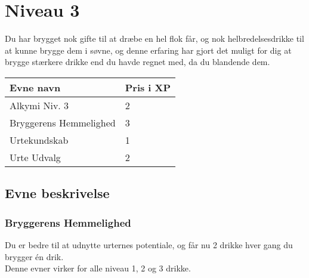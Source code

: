\chapter*{Niveau 3}
Du har brygget nok gifte til at dræbe en hel flok får, og nok helbredelsesdrikke til at kunne brygge dem i søvne, og denne erfaring har gjort det muligt for dig at brygge stærkere drikke end du havde regnet med, da du blandende dem.

\begin{table}[H]
    \centering
    \begin{tabular}{|p{}|p{}|}
    \rowcolor{cerulean!80}\hline
        Evne navn & Pris i XP \\\hline
        Alkymi Niv. 3 & 2\\\hline
        Bryggerens Hemmelighed & 3\\\hline
        Urtekundskab & 1 \\\hline
        Urte Udvalg & 2\\
         \hline
    \end{tabular}
\end{table}
\section*{Evne beskrivelse}




\subsection*{Bryggerens Hemmelighed}
Du er bedre til at udnytte urternes potentiale, og får nu 2 drikke hver gang du brygger én drik.\\
Denne evner virker for alle niveau 1, 2 og 3 drikke.\\




